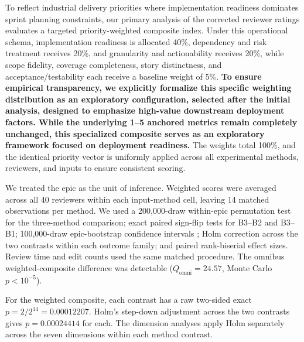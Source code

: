 \documentclass[pdflatex,sn-basic]{sn-jnl}
\begin{document}
To reflect industrial delivery priorities where implementation readiness dominates sprint planning constraints, our primary analysis of the corrected reviewer ratings evaluates a targeted priority-weighted composite index. Under this operational schema, implementation readiness is allocated 40\%, dependency and risk treatment receives 20\%, and granularity and actionability receives 20\%, while scope fidelity, coverage completeness, story distinctness, and acceptance/testability each receive a baseline weight of 5\%. \textbf{To ensure empirical transparency, we explicitly formalize this specific weighting distribution as an exploratory configuration, selected after the initial analysis, designed to emphasize high-value downstream deployment factors. While the underlying 1--5 anchored metrics remain completely unchanged, this specialized composite serves as an exploratory framework focused on deployment readiness.} The weights total 100\%, and the identical priority vector is uniformly applied across all experimental methods, reviewers, and inputs to ensure consistent scoring.

We treated the epic as the unit of inference. Weighted scores were averaged across all 40 reviewers within each input-method cell, leaving 14 matched observations per method. We used a 200,000-draw within-epic permutation test for the three-method comparison; exact paired sign-flip tests for B3--B2 and B3--B1; 100,000-draw epic-bootstrap confidence intervals \citep{R97}; Holm correction \citep{R96} across the two contrasts within each outcome family; and paired rank-biserial effect sizes. Review time and edit counts used the same matched procedure. The omnibus weighted-composite difference was detectable (\(Q_{\mathrm{omni}}=24.57\), Monte Carlo \(p<10^{-5}\)).

For the weighted composite, each contrast has a raw two-sided exact \(p=2/2^{14}=0.00012207\). Holm's step-down adjustment across the two contrasts gives \(p=0.00024414\) for each. The dimension analyses apply Holm separately across the seven dimensions within each method contrast.
\end{document}
